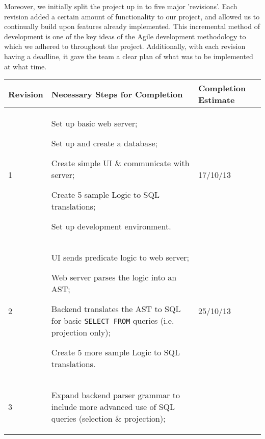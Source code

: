 \documentclass[a4paper, 11pt]{article}
\begin{document}
    Moreover, we initially split the project up in to five major 'revisions'.
    Each revision added a certain amount of functionality to our project, and
    allowed us to continually build upon features already implemented. This
    incremental method of development is one of the key ideas of the Agile
    development methodology to which we adhered to throughout the project.
     Additionally, with each revision having a
    deadline, it gave the team a clear plan of what was to be implemented at
    what time.

    \begin{table}[H]
      \centering
      \begin{tabular}{| l | p{} | l |}
        \hline
        \textbf{Revision} & \textbf{Necessary Steps for Completion}
          & \textbf{Completion Estimate} \\
        \hline
        1 &
          \begin{compactitem}
            \item Set up basic web server;
            \item Set up and create a database;
            \item Create simple UI \& communicate with server;
            \item Create 5 sample Logic to SQL translations;
            \item Set up development environment.
          \end{compactitem}
          & 17/10/13 \\
        \hline
        2 &
          \begin{compactitem}
            \item UI sends predicate logic to web server;
            \item Web server parses the logic into an AST;
            \item Backend translates the AST to SQL for basic \texttt{SELECT
              FROM} queries (i.e. projection only);
            \item Create 5 more sample Logic to SQL translations.
          \end{compactitem}
          & 25/10/13 \\
        \hline
        3 &
          \begin{compactitem}
            \item Expand backend parser grammar to include more advanced use of
              SQL queries (selection \& projection);

\end{compactitem}
\end{tabular}
\end{table}
\end{document}
